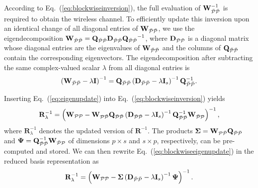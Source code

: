 \documentclass[journal,12pt,onecolumn,draftclsnofoot]{IEEEtran}
\begin{document}
According to Eq.~(\ref{eq:blockwiseinversion}), the full evaluation of $\mathbf{W}_{\mathcal{\Bar{P}\Bar{P}}}^{-1}$ is required to obtain the wireless channel. To efficiently update this inversion upon an identical change of all diagonal entries of $\mathbf{W}_{\mathcal{\Bar{P}\Bar{P}}}$, we use the eigendecomposition $\mathbf{W}_{\mathcal{\Bar{P}\Bar{P}}} = \mathbf{Q_{\mathcal{\Bar{P}\Bar{P}}} D_{\mathcal{\Bar{P}\Bar{P}}}}\mathbf{Q_{\mathcal{\Bar{P}\Bar{P}}}}^{-1}$, where $\mathbf{D_{\mathcal{\Bar{P}\Bar{P}}}}$ is a diagonal matrix whose diagonal entries are the eigenvalues of $\mathbf{W}_{\mathcal{\Bar{P}\Bar{P}}}$ and the columns of $\mathbf{Q_{\mathcal{\Bar{P}\Bar{P}}}}$ contain the corresponding eigenvectors. 
The eigendecomposition after subtracting the same complex-valued scalar $\lambda$ from all diagonal
entries is
\begin{equation}
\left(\mathbf{W}_{\mathcal{\Bar{P}\Bar{P}}}-\lambda \mathbf{I}\right)^{-1} = \mathbf{Q}_{\mathcal{\Bar{P}\Bar{P}}}\left(\mathbf{D}_{\mathcal{\Bar{P}\Bar{P}}}-\lambda \mathbf{I}_s\right)^{-1} \mathbf{Q}_{\mathcal{\Bar{P}\Bar{P}}}^{-1}.
\label{eq:eigenupdate}
\end{equation}

\noindent Inserting Eq.~(\ref{eq:eigenupdate}) into Eq.~(\ref{eq:blockwiseinversion}) yields
\begin{equation}
        \mathbf{R}^{-1}_{\lambda} = 
        \left(\mathbf{W}_{\mathcal{PP}} - 
        \mathbf{W}_{\mathcal{P\Bar{P}}} \mathbf{Q}_{\mathcal{\Bar{P}\Bar{P}}}
        \left(\mathbf{D}_{\mathcal{\Bar{P}\Bar{P}}}-\lambda \mathbf{I}_s\right)^{-1} 
        \mathbf{Q}_{\mathcal{\Bar{P}\Bar{P}}}^{-1} \mathbf{W}_{\mathcal{\Bar{P}P}} 
        \right)^{-1},
\label{eq:blockwiseeigenupdate}
\end{equation}
where $\mathbf{R}^{-1}_{\lambda}$ denotes the updated version of $\mathbf{R}^{-1}$.
The products $\mathbf{\Sigma}=\mathbf{W}_{\mathcal{P\Bar{P}}} \mathbf{Q}_{\mathcal{\Bar{P}\Bar{P}}}$ and $\mathbf{\Psi}=\mathbf{Q}_{\mathcal{\Bar{P}\Bar{P}}}^{-1} \mathbf{W}_{\mathcal{\Bar{P}P}}$ of dimensions $p \times s$ and $s \times p$, respectively, can be pre-computed and stored. We can then rewrite Eq.~(\ref{eq:blockwiseeigenupdate}) in the reduced basis representation as 
\begin{equation}
        \mathbf{R}^{-1}_{\lambda} = 
        \left( \mathbf{W}_{\mathcal{PP}} - \mathbf{\Sigma} \left(\mathbf{D}_{\mathcal{\Bar{P}\Bar{P}}}-\lambda \mathbf{I}_s\right)^{-1} \mathbf{\Psi}
        \right)^{-1}.
\label{eq:reducedeigenupdate}
\end{equation}
\end{document}
